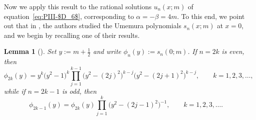 \documentclass[pdftex]{sigma}
\numberwithin{equation}{section}
\newtheorem{Lemma}[Theorem]{Lemma}
\begin{document}
Now we apply this result to the rational solutions $u_n(x;m)$ of equation~\eqref{eq:PIII-$D_6$}, corresponding to ${\alpha = -\beta= 4m}$. To this end, we point out that in \cite{clarkson2018constructive}, the authors studied the Umemura polynomials $s_n(x;m)$ at $x=0$, and we begin by recalling one of their results.
\begin{Lemma}[\cite{clarkson2018constructive}]\label{lem:umemura-at-zero}
Set $y:=m+\tfrac{1}{2}$ and write $\phi_n(y):=s_n(0;m)$. If $n=2k$ is even, then
\begin{equation*}%
\phi_{2k}(y)=y^k\big(y^2-1\big)^k\prod_{j=1}^{k-1}\big(y^2-(2j)^2\big)^{k-j}\big(y^2-(2j+1)^2\big)^{k-j},\qquad k=1,2,3,\dots,
\end{equation*}
while if $n=2k-1$ is odd, then
\begin{equation}
\phi_{2k-1}(y)=\phi_{2k}(y)\prod_{j=1}^{k}\big(y^2-(2j-1)^2\big)^{-1},\qquad k=1,2,3,\dots.
\label{eq:phi-shift-down}
\end{equation}
\end{Lemma}
\end{document}
